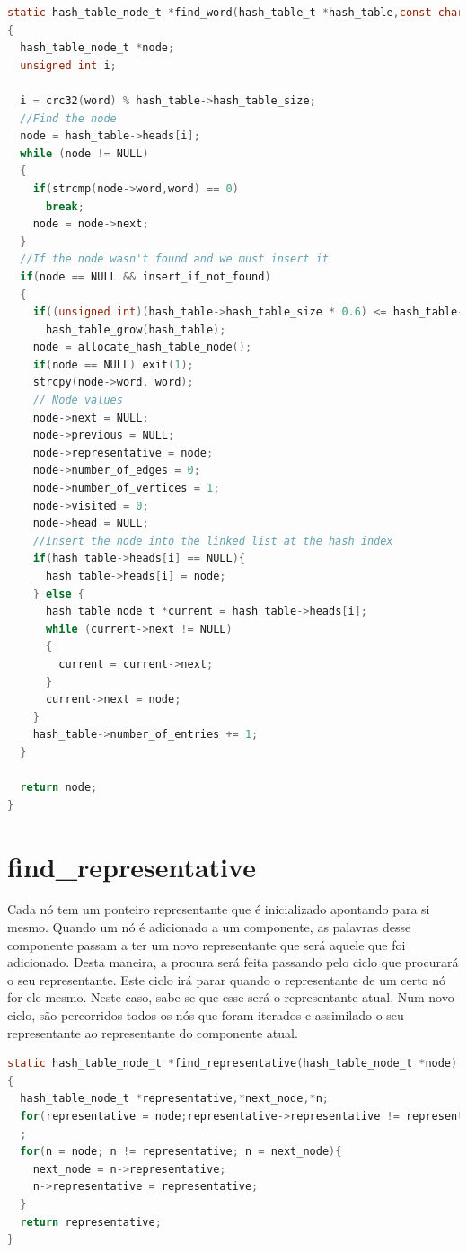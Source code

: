 	\begin{lstlisting}[language=C]
static hash_table_node_t *find_word(hash_table_t *hash_table,const char *word,int insert_if_not_found)
{
  hash_table_node_t *node;
  unsigned int i;

  i = crc32(word) % hash_table->hash_table_size;
  //Find the node 
  node = hash_table->heads[i];
  while (node != NULL)
  {
    if(strcmp(node->word,word) == 0)
      break;
    node = node->next;
  }
  //If the node wasn't found and we must insert it
  if(node == NULL && insert_if_not_found)
  {
    if((unsigned int)(hash_table->hash_table_size * 0.6) <= hash_table->number_of_entries)
      hash_table_grow(hash_table);
    node = allocate_hash_table_node();
    if(node == NULL) exit(1);
    strcpy(node->word, word);
    // Node values
    node->next = NULL;
    node->previous = NULL;
    node->representative = node;
    node->number_of_edges = 0;
    node->number_of_vertices = 1;
    node->visited = 0;
    node->head = NULL;
    //Insert the node into the linked list at the hash index
    if(hash_table->heads[i] == NULL){
      hash_table->heads[i] = node;
    } else {
      hash_table_node_t *current = hash_table->heads[i];
      while (current->next != NULL)
      {
        current = current->next;
      }
      current->next = node;
    }
    hash_table->number_of_entries += 1;
  }
  
  return node;
}
	\end{lstlisting}
	
	\section{find\_representative}
Cada nó tem um ponteiro representante que é inicializado apontando para si mesmo.
Quando um nó é adicionado a um componente, as palavras desse componente passam a ter 
um novo representante que será aquele que foi adicionado. Desta maneira, a procura será feita 
passando pelo ciclo que procurará o seu representante. Este ciclo irá parar 
quando o representante de um certo nó for ele mesmo. Neste caso, sabe-se que 
esse será o representante atual. Num novo ciclo, são percorridos todos os nós que foram iterados e 
assimilado o seu representante ao representante do componente atual.
	
	\label{findrepresentative}
	\begin{lstlisting}[language=C]
static hash_table_node_t *find_representative(hash_table_node_t *node)
{
  hash_table_node_t *representative,*next_node,*n;
  for(representative = node;representative->representative != representative; representative = representative->representative)
  ;
  for(n = node; n != representative; n = next_node){
    next_node = n->representative;
    n->representative = representative;
  }
  return representative;
}
	\end{lstlisting}
	
